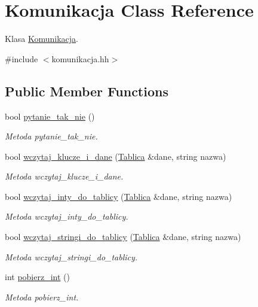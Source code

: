 \hypertarget{class_komunikacja}{\section{Komunikacja Class Reference}
\label{class_komunikacja}
}


Klasa \hyperlink{class_komunikacja}{Komunikacja}.  




{\ttfamily \#include $<$komunikacja.\+hh$>$}

\subsection*{Public Member Functions}
\begin{DoxyCompactItemize}
\item 
bool \hyperlink{class_komunikacja_a22554e7095eccc02f899a5022382fe0e}{pytanie\+\_\+tak\+\_\+nie} ()
\begin{DoxyCompactList}\small\item\em Metoda pytanie\+\_\+tak\+\_\+nie. \end{DoxyCompactList}\item 
bool \hyperlink{class_komunikacja_a94497dd3cdaa7f52355e8edb0ca854b4}{wczytaj\+\_\+klucze\+\_\+i\+\_\+dane} (\hyperlink{class_tablica}{Tablica} \&dane, string nazwa)
\begin{DoxyCompactList}\small\item\em Metoda wczytaj\+\_\+klucze\+\_\+i\+\_\+dane. \end{DoxyCompactList}\item 
bool \hyperlink{class_komunikacja_a584a632826e92cf838e64368b8abbe05}{wczytaj\+\_\+inty\+\_\+do\+\_\+tablicy} (\hyperlink{class_tablica}{Tablica} \&dane, string nazwa)
\begin{DoxyCompactList}\small\item\em Metoda wczytaj\+\_\+inty\+\_\+do\+\_\+tablicy. \end{DoxyCompactList}\item 
bool \hyperlink{class_komunikacja_a72e1facbd11615a383ed799d490aed52}{wczytaj\+\_\+stringi\+\_\+do\+\_\+tablicy} (\hyperlink{class_tablica}{Tablica} \&dane, string nazwa)
\begin{DoxyCompactList}\small\item\em Metoda wczytaj\+\_\+stringi\+\_\+do\+\_\+tablicy. \end{DoxyCompactList}\item 
int \hyperlink{class_komunikacja_a28d01913291afd05c5069182fd29506b}{pobierz\+\_\+int} ()
\begin{DoxyCompactList}\small\item\em Metoda pobierz\+\_\+int. \end{DoxyCompactList}\end{DoxyCompactItemize}


